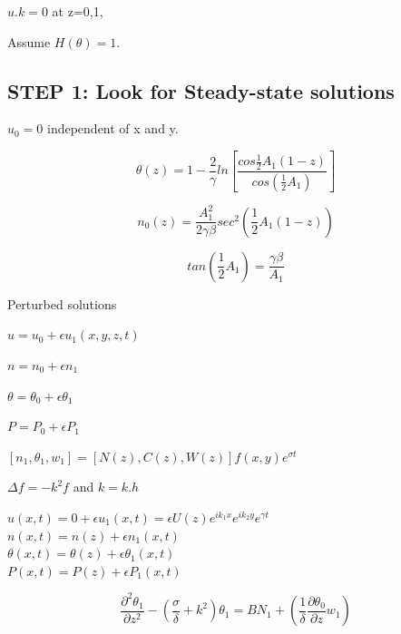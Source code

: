 \documentclass[]{article}
\numberwithin{equation}{section}		%
\begin{document}
\begin{center}
$u.k = 0$ at z=0,1,\\
 \end{center}

Assume $H(\theta)=1.$

\subsection{STEP 1: Look for Steady-state solutions}

$u_0=0$ independent of x and y.

\begin{equation}
\theta(z)= 1- \frac{2}{\gamma}ln [\frac{cos{\frac{1}{2} A_1 (1-z)}}{cos(\frac{1}{2} A_1)}] \nonumber
\end{equation}

\begin{equation}
n_0(z) = \frac{A_1^2}{2\gamma \beta} sec^2(\frac{1}{2} A_1 (1-z))
\end{equation}

\begin{equation}
tan(\frac{1}{2} A_1) = \frac{\gamma \beta}{A_1}
\end{equation}

Perturbed solutions

\begin{center}
$u = u_0 + \epsilon u_1(x,y,z,t)$
\end{center}
\begin{center}
$n = n_0 + \epsilon n_1$
\end{center}
\begin{center}
$\theta = \theta_0 + \epsilon \theta_1$
\end{center}
\begin{center}
$P = P_0 + \epsilon P_1$
\end{center}

$[n_1,\theta_1,w_1] = [N(z),C(z),W(z)] f(x,y) e^{\sigma t}$

$\Delta f = -k^2 f$ and $k=k.h$

\begin{center}
$u(x,t)=0+\epsilon u_1(x,t) = \epsilon U(z) e^{i k_1 x} e^{i k_2 y} e^{\gamma t}$\\
$n(x,t) = n(z) + \epsilon n_1(x,t)$\\
$\theta(x,t) = \theta(z) + \epsilon \theta_1(x,t)$\\
$P(x,t) = P(z) + \epsilon P_1(x,t)$
\end{center}

\begin{equation}
\frac{\partial^2 \theta_1}{\partial z^2} - (\frac{\sigma}{\delta} + k^2) \theta_1 = BN_1 + (\frac{1}{\delta} \frac{\partial \theta_0}{\partial z} w_1) \nonumber
\end{equation}
\end{document}
